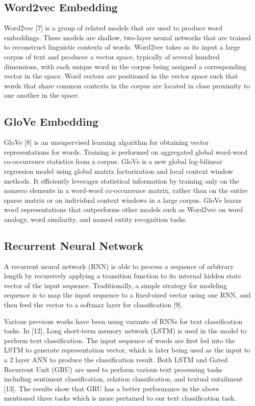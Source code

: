 \documentclass{article}
\begin{document}
\subsection{Word2vec Embedding}
Word2vec [7] is a group of related models that are used to produce word embeddings. These models are shallow, two-layer neural networks that are trained to reconstruct linguistic contexts of words. Word2vec takes as its input a large corpus of text and produces a vector space, typically of several hundred dimensions, with each unique word in the corpus being assigned a corresponding vector in the space. Word vectors are positioned in the vector space such that words that share common contexts in the corpus are located in close proximity to one another in the space.

\subsection{GloVe Embedding}
GloVe [8] is an unsupervised learning algorithm for obtaining vector representations for words. Training is performed on aggregated global word-word co-occurrence statistics from a corpus. GloVe is a new global log-bilinear regression model using global matrix factorization and local context window methods. It  efficiently leverages statistical information by training only on the nonzero elements in a word-word co-occurrence matrix, rather than on the entire sparse matrix or on individual context windows in a large corpus. GloVe learns word representations that outperforms other models such as Word2vec on word analogy, word similarity, and named entity recognition tasks.


\subsection{Recurrent Neural Network}
A recurrent neural network (RNN) is able to process a sequence of arbitrary length by recursively applying a transition function to its internal hidden state vector of the input sequence. Traditionally, a simple strategy for modeling sequence is to map the input sequence to a fixed-sized vector using one RNN, and then feed the vector to a softmax layer for classification [9]. 

Various previous works have been using variants of RNNs for text classification tasks. In [12], Long short-term memory network (LSTM) is used in the model to perform text classification. The input sequence of words are first fed into the LSTM to generate representation vector, which is later being used as the input to a 2 layer ANN to produce the classification result. Both LSTM and Gated Recurrent Unit (GRU) are used to perform various text processing tasks including sentiment classification, relation classification, and textual entailment [13]. The results show that GRU has a better performance in the above mentioned three tasks which is more pertained to our text classification task. 
\end{document}
